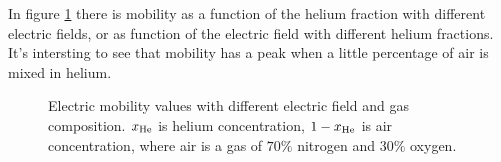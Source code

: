 In figure \ref{fig:mu} there is mobility as a function of the helium fraction with different electric fields, or as function of the electric field with different helium fractions. It's intersting to see that mobility has a peak when a little percentage of air is mixed in helium.
\begin{figure}
 \hfill
 \caption{Electric mobility values with different electric field and gas composition. $x_{\ce{He}}$ is helium concentration, $1-x_{\ce{He}}$ is air concentration, where air is a gas of $70\%$ nitrogen and $30\%$ oxygen.}
 \label{fig:mu}
\end{figure}


